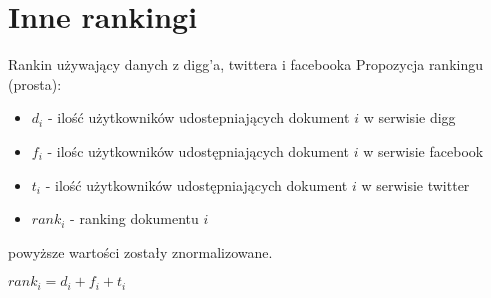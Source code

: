 \section{Inne rankingi}

Rankin używający danych z digg'a, twittera i facebooka
Propozycja rankingu (prosta):

\begin{itemize}
\item $d_i$ - ilość użytkowników udostepniających dokument $i$ w serwisie digg
\item $f_i$ - ilośc użytkowników udostępniających dokument $i$ w serwisie facebook
\item  $t_i$ - ilość użytkowników udostępniających dokument $i$ w serwisie twitter
\item $rank_i$ - ranking dokumentu $i$
\end{itemize}

powyższe wartości zostały znormalizowane.

$rank_i = d_i + f_i + t_i$


